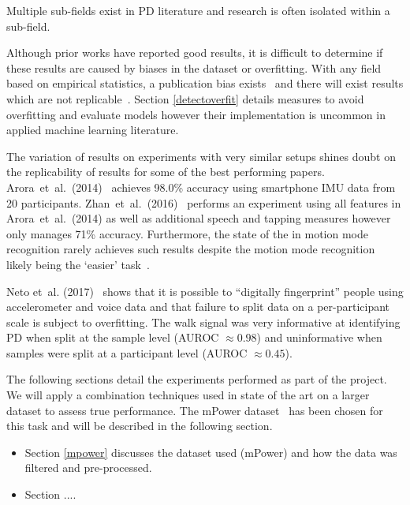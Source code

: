 \documentclass[12pt, twoside]{book}
\begin{document}
\begin{highlight}
Multiple sub-fields exist in PD literature and research is often isolated within a sub-field.
\end{highlight}

Although prior works have reported good results, it is difficult to determine if these results are caused by biases in the dataset or overfitting. With any field based on empirical statistics, a publication bias exists~\cite{publicationbias} and there will exist results which are not replicable~\cite{replicability}. Section \ref{detectoverfit} details measures to avoid overfitting and evaluate models however their implementation is uncommon in applied machine learning literature. 

The variation of results on experiments with very similar setups shines doubt on the replicability of results for some of the best performing papers. Arora~et~al.~(2014)~\cite{arora2014high} achieves 98.0\% accuracy using smartphone IMU data from 20 participants. Zhan~et~al.~(2016)~\cite{zhan2016high} performs an experiment using all features in Arora~et~al.~(2014) as well as additional speech and tapping measures however only manages 71\% accuracy. Furthermore, the state of the in motion mode recognition rarely achieves such results despite the motion mode recognition likely being the `easier' task~\cite{motionmoderecognition}. 

Neto et~al. (2017)~\cite{mpowerneto2017analysis} shows that it is possible to ``digitally fingerprint'' people using accelerometer and voice data and that failure to split data on a per-participant scale is subject to overfitting. The walk signal was very informative at identifying PD when split at the sample level (AUROC $\approx 0.98$) and uninformative when samples were split at a participant level (AUROC $\approx 0.45$). 
 
The following sections detail the experiments performed as part of the project. We will apply a combination techniques used in state of the art on a larger dataset to assess true performance. The mPower dataset~\cite{mpower} has been chosen for this  task and will be described in the following section.

\begin{itemize}
\item Section \ref{mpower} discusses the dataset used (mPower) and how the data was filtered and pre-processed.
\item Section ....
\end{itemize}
\end{document}
